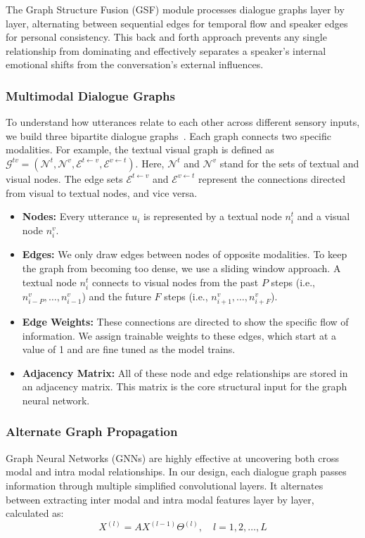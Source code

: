\documentclass[runningheads]{llncs}
\begin{document}
The Graph Structure Fusion (GSF) module processes dialogue graphs layer by layer, alternating between sequential edges for temporal flow and speaker edges for personal consistency. This back and forth approach prevents any single relationship from dominating and effectively separates a speaker's internal emotional shifts from the conversation's external influences.
\subsubsection{Multimodal Dialogue Graphs}
To understand how utterances relate to each other across different sensory inputs, we build three bipartite dialogue graphs~\cite{hu2021mmgcn,li2024graphsmile}. Each graph connects two specific modalities. For example, the textual visual graph is defined as $\mathcal{G}^{tv} = (\mathcal{N}^t, \mathcal{N}^v, \mathcal{E}^{t \leftarrow v}, \mathcal{E}^{v \leftarrow t})$. Here, $\mathcal{N}^t$ and $\mathcal{N}^v$ stand for the sets of textual and visual nodes. The edge sets $\mathcal{E}^{t \leftarrow v}$ and $\mathcal{E}^{v \leftarrow t}$ represent the connections directed from visual to textual nodes, and vice versa.

\begin{itemize}
  \item \textbf{Nodes:} Every utterance $u_i$ is represented by a textual node $n^t_i$ and a visual node $n^v_i$.
  \item \textbf{Edges:} We only draw edges between nodes of opposite modalities. To keep the graph from becoming too dense, we use a sliding window approach. A textual node $n^t_i$ connects to visual nodes from the past $P$ steps (i.e., $n^v_{i-P}, \dots, n^v_{i-1}$) and the future $F$ steps (i.e., $n^v_{i+1}, \dots, n^v_{i+F}$).
  \item \textbf{Edge Weights:} These connections are directed to show the specific flow of information. We assign trainable weights to these edges, which start at a value of 1 and are fine tuned as the model trains.
  \item \textbf{Adjacency Matrix:} All of these node and edge relationships are stored in an adjacency matrix. This matrix is the core structural input for the graph neural network.
\end{itemize}

\subsubsection{Alternate Graph Propagation}
Graph Neural Networks (GNNs) \cite{kipf2017gcn,scarselli2008graph} are highly effective at uncovering both cross modal and intra modal relationships. In our design, each dialogue graph passes information through multiple simplified convolutional layers. It alternates between extracting inter modal and intra modal features layer by layer, calculated as:
\begin{equation}
  X^{(l)} = AX^{(l-1)}\Theta^{(l)}, \quad l = 1, 2, \dots, L
\end{equation}
\end{document}
